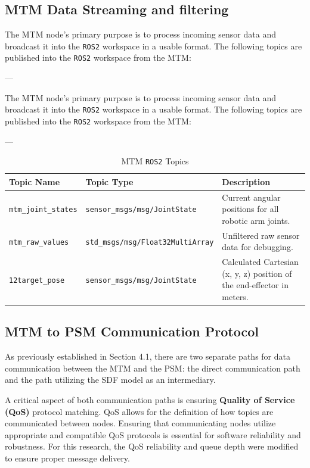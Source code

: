 \subsection{MTM Data Streaming and filtering}

The MTM node's primary purpose is to process incoming sensor data and broadcast it into the \texttt{ROS2} workspace in a usable format. The following topics are published into the \texttt{ROS2} workspace from the MTM:

---

The MTM node's primary purpose is to process incoming sensor data and broadcast it into the \texttt{ROS2} workspace in a usable format. The following topics are published into the \texttt{ROS2} workspace from the MTM:

---

\begin{table}[h!]
    \centering
    \caption{MTM \texttt{ROS2} Topics}
    \label{tab:mtm_ros2_topics}
    \begin{tabular}{|l|l|p{5cm}|} %
        \hline
        \textbf{Topic Name} & \textbf{Topic Type} & \textbf{Description} \\
        \hline
        \texttt{mtm\_joint\_states} & \texttt{sensor\_msgs/msg/JointState} & Current angular positions for all robotic arm joints. \\
        \hline
        \texttt{mtm\_raw\_values} & \texttt{std\_msgs/msg/Float32MultiArray} & Unfiltered raw sensor data for debugging. \\
        \hline
        \texttt{12target\_pose} & \texttt{sensor\_msgs/msg/JointState} & Calculated Cartesian (x, y, z) position of the end-effector in meters. \\
        \hline
    \end{tabular}
\end{table}

\subsection{MTM to PSM Communication Protocol}

As previously established in Section 4.1, there are two separate paths for data communication between the MTM and the PSM: the direct communication path and the path utilizing the SDF model as an intermediary.

A critical aspect of both communication paths is ensuring \textbf{Quality of Service (QoS)} protocol matching. QoS allows for the definition of how topics are communicated between nodes. Ensuring that communicating nodes utilize appropriate and compatible QoS protocols is essential for software reliability and robustness. For this research, the QoS reliability and queue depth were modified to ensure proper message delivery.

